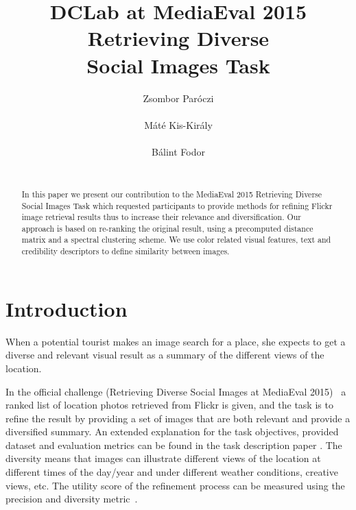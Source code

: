 \documentclass{acm_proc_article-me}
\begin{document}

\title{DCLab at MediaEval 2015 Retrieving Diverse \\ Social Images Task}


\author{
\alignauthor
Zsombor Par\'oczi\\
       \\
\alignauthor
M\'at\'e Kis-Kir\'aly \\
		\\
\alignauthor
B\'alint Fodor\\
		\\
}

\maketitle
\begin{abstract}
In this paper we present our contribution to the MediaEval 2015 Retrieving Diverse Social Images Task which requested participants to provide methods for refining Flickr image retrieval results thus to increase their relevance and diversification. Our approach is based on re-ranking the original result, using a precomputed distance matrix and a spectral clustering scheme. We use color related visual features, text and credibility descriptors to define similarity between images.
\end{abstract}

\section{Introduction}

When a potential tourist makes an image search for a place, she expects to get a diverse and relevant visual result as a summary of the different views of the location. 

In the official challenge (Retrieving Diverse Social Images at MediaEval 2015)~\cite{Task2015} a ranked list of location photos retrieved from Flickr is given, and the task is to refine the result by providing a set of images that are both relevant and provide a diversified summary. An extended explanation for the task objectives, provided dataset and evaluation metrics can be found in the task description paper \cite{Task2015}. The diversity means that images can illustrate different views of the location at different times of the day/year and under different weather conditions, creative views, etc. The utility score of the refinement process can be measured using the precision and diversity metric~\cite{Taneva2010}. 
\end{document}
